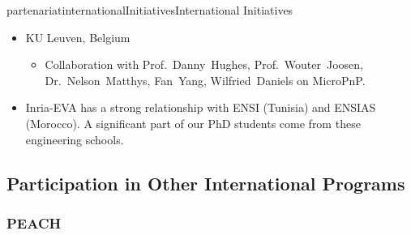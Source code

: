 \documentclass{ra2016}
\begin{document}
\begin{module}{partenariat}{internationalInitiatives}{International Initiatives}
\begin{itemize}
\begin{itemize}
\begin{itemize}
                \end{itemize}
        \end{itemize}
    \item KU Leuven, Belgium
        \begin{itemize}
            \item Collaboration with Prof.~Danny~Hughes, Prof.~Wouter~Joosen, Dr.~Nelson~Matthys, Fan~Yang, Wilfried~Daniels on MicroPnP.
        \end{itemize}
    \item Inria-EVA has a strong relationship with ENSI (Tunisia) and ENSIAS (Morocco).
        A significant part of our PhD students come from these engineering schools.
\end{itemize}



\subsection{Participation in Other International Programs}


\subsubsection{PEACH}


\end{module}
\end{document}
